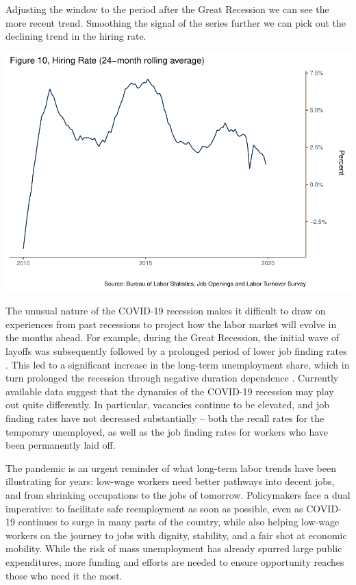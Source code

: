 \documentclass[
  11pt,
]{article}
\begin{document}
Adjusting the window to the period after the Great Recession we can see
the more recent trend. Smoothing the signal of the series further we can
pick out the declining trend in the hiring rate.

\begin{center}\includegraphics{JOLTS_files/figure-latex/unnamed-chunk-16-1} \end{center}

The unusual nature of the COVID-19 recession makes it difficult to draw
on experiences from past recessions to project how the labor market will
evolve in the months ahead. For example, during the Great Recession, the
initial wave of layoffs was subsequently followed by a prolonged period
of lower job finding rates \citep{elsby09}. This led to a significant
increase in the long-term unemployment share, which in turn prolonged
the recession through negative duration dependence \citep{krueger14}.
Currently available data suggest that the dynamics of the COVID-19
recession may play out quite differently. In particular, vacancies
continue to be elevated, and job finding rates have not decreased
substantially -- both the recall rates for the temporary unemployed, as
well as the job finding rates for workers who have been permanently laid
off.

The pandemic is an urgent reminder of what long-term labor trends have
been illustrating for years: low-wage workers need better pathways into
decent jobs, and from shrinking occupations to the jobs of tomorrow.
Policymakers face a dual imperative: to facilitate safe reemployment as
soon as possible, even as COVID-19 continues to surge in many parts of
the country, while also helping low-wage workers on the journey to jobs
with dignity, stability, and a fair shot at economic mobility. While the
risk of mass unemployment has already spurred large public expenditures,
more funding and efforts are needed to ensure opportunity reaches those
who need it the most.
\end{document}
